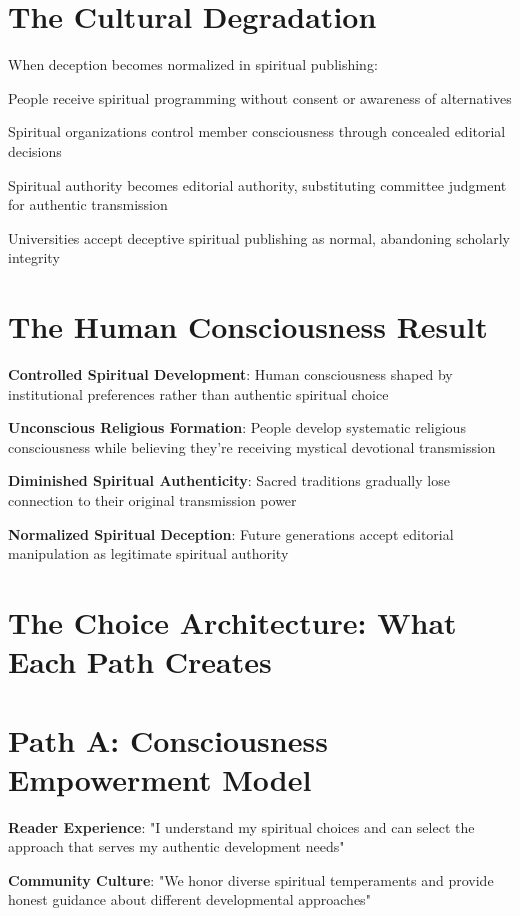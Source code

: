 \documentclass[11pt,twoside]{book}
\begin{document}
\section*{The Cultural Degradation}
\label{sec:orgc081426}
When deception becomes normalized in spiritual publishing:

People receive spiritual programming without consent or awareness of alternatives

Spiritual organizations control member consciousness through concealed editorial decisions

Spiritual authority becomes editorial authority, substituting committee judgment for authentic transmission

Universities accept deceptive spiritual publishing as normal, abandoning scholarly integrity
\section*{The Human Consciousness Result}
\label{sec:org6115935}
\textbf{\textbf{Controlled Spiritual Development}}: Human consciousness shaped by institutional preferences rather than authentic spiritual choice

\textbf{\textbf{Unconscious Religious Formation}}: People develop systematic religious consciousness while believing they're receiving mystical devotional transmission

\textbf{\textbf{Diminished Spiritual Authenticity}}: Sacred traditions gradually lose connection to their original transmission power

\textbf{\textbf{Normalized Spiritual Deception}}: Future generations accept editorial manipulation as legitimate spiritual authority
\section*{The Choice Architecture: What Each Path Creates}
\label{sec:orgdd4add8}

\section*{Path A: Consciousness Empowerment Model}
\label{sec:org8fc440f}
\textbf{\textbf{Reader Experience}}: "I understand my spiritual choices and can select the approach that serves my authentic development needs"

\textbf{\textbf{Community Culture}}: "We honor diverse spiritual temperaments and provide honest guidance about different developmental approaches"
\end{document}
